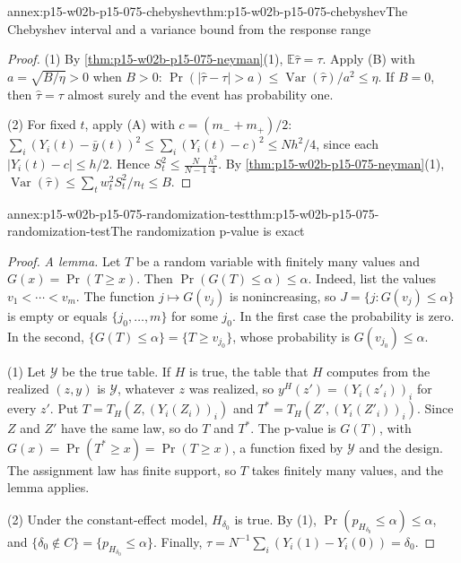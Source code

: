 \begin{annexitem}{annex:p15-w02b-p15-075-chebyshev}{thm:p15-w02b-p15-075-chebyshev}{The Chebyshev interval and a variance bound from the response range}
\begin{proof}
(1) By \cref{thm:p15-w02b-p15-075-neyman}(1), \(\mathbb E\widehat\tau=\tau\).
Apply (B) with \(a=\sqrt{B/\eta}>0\) when \(B>0\):
\(\Pr(|\widehat\tau-\tau|>a)\leq\operatorname{Var}(\widehat\tau)/a^2
\leq\eta\). If \(B=0\), then \(\widehat\tau=\tau\) almost surely and the
event has probability one.

(2) For fixed \(t\), apply (A) with \(c=(m_-+m_+)/2\):
\(\sum_i(Y_i(t)-\bar y(t))^2\leq\sum_i(Y_i(t)-c)^2\leq Nh^2/4\), since each
\(|Y_i(t)-c|\leq h/2\). Hence \(S_t^2\leq\frac N{N-1}\frac{h^2}4\). By
\cref{thm:p15-w02b-p15-075-neyman}(1),
\(\operatorname{Var}(\widehat\tau)\leq\sum_tw_t^2S_t^2/n_t\leq B\).
\end{proof}
\end{annexitem}

\begin{annexitem}{annex:p15-w02b-p15-075-randomization-test}{thm:p15-w02b-p15-075-randomization-test}{The randomization p-value is exact}
\begin{proof}
\emph{A lemma.} Let \(T\) be a random variable with finitely many values and
\(G(x)=\Pr(T\geq x)\). Then \(\Pr(G(T)\leq\alpha)\leq\alpha\). Indeed, list
the values \(v_1<\cdots<v_m\). The function \(j\mapsto G(v_j)\) is
nonincreasing, so \(J=\{j:G(v_j)\leq\alpha\}\) is empty or equals
\(\{j_0,\ldots,m\}\) for some \(j_0\). In the first case the probability is
zero. In the second, \(\{G(T)\leq\alpha\}=\{T\geq v_{j_0}\}\), whose
probability is \(G(v_{j_0})\leq\alpha\).

(1) Let \(\mathcal Y\) be the true table. If \(H\) is true, the table that
\(H\) computes from the realized \((z,y)\) is \(\mathcal Y\), whatever \(z\)
was realized, so \(y^H(z')=(Y_i(z'_i))_i\) for every \(z'\). Put
\(T=T_H(Z,(Y_i(Z_i))_i)\) and \(T^*=T_H(Z',(Y_i(Z'_i))_i)\). Since \(Z\)
and \(Z'\) have the same law, so do \(T\) and \(T^*\). The p-value is
\(G(T)\), with \(G(x)=\Pr(T^*\geq x)=\Pr(T\geq x)\), a function fixed by
\(\mathcal Y\) and the design. The assignment law has finite support, so
\(T\) takes finitely many values, and the lemma applies.

(2) Under the constant-effect model, \(H_{\delta_0}\) is true. By (1),
\(\Pr(p_{H_{\delta_0}}\leq\alpha)\leq\alpha\), and
\(\{\delta_0\notin C\}=\{p_{H_{\delta_0}}\leq\alpha\}\). Finally,
\(\tau=N^{-1}\sum_i(Y_i(1)-Y_i(0))=\delta_0\).
\end{proof}
\end{annexitem}

